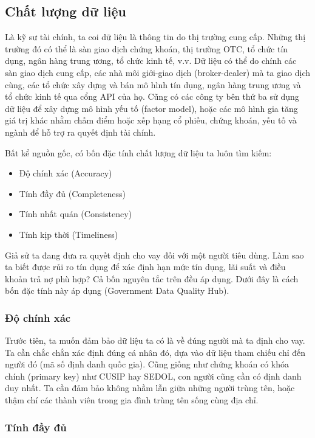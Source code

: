 \subsection{Chất lượng dữ liệu}

Là kỹ sư tài chính, ta coi dữ liệu là thông tin do thị trường cung cấp. Những thị trường đó có thể là sàn giao dịch chứng khoán, thị trường OTC, tổ chức tín dụng, ngân hàng trung ương, tổ chức kinh tế, v.v. Dữ liệu có thể do chính các sàn giao dịch cung cấp, các nhà môi giới-giao dịch (broker-dealer) mà ta giao dịch cùng, các tổ chức xây dựng và bán mô hình tín dụng, ngân hàng trung ương và tổ chức kinh tế qua cổng API của họ. Cũng có các công ty bên thứ ba sử dụng dữ liệu để xây dựng mô hình yếu tố (factor model), hoặc các mô hình gia tăng giá trị khác nhằm chấm điểm hoặc xếp hạng cổ phiếu, chứng khoán, yếu tố và ngành để hỗ trợ ra quyết định tài chính.

Bất kể nguồn gốc, có bốn đặc tính chất lượng dữ liệu ta luôn tìm kiếm:
\begin{itemize}
  \item Độ chính xác (Accuracy)
  \item Tính đầy đủ (Completeness)
  \item Tính nhất quán (Consistency)
  \item Tính kịp thời (Timeliness)
\end{itemize}

Giả sử ta đang đưa ra quyết định cho vay đối với một người tiêu dùng. Làm sao ta biết được rủi ro tín dụng để xác định hạn mức tín dụng, lãi suất và điều khoản trả nợ phù hợp? Cả bốn nguyên tắc trên đều áp dụng. Dưới đây là cách bốn đặc tính này áp dụng (Government Data Quality Hub).

\subsubsection{Độ chính xác}

Trước tiên, ta muốn đảm bảo dữ liệu ta có là về đúng người mà ta định cho vay. Ta cần chắc chắn xác định đúng cá nhân đó, dựa vào dữ liệu tham chiếu chỉ đến người đó (mã số định danh quốc gia). Cũng giống như chứng khoán có khóa chính (primary key) như CUSIP hay SEDOL, con người cũng cần có định danh duy nhất. Ta cần đảm bảo không nhầm lẫn giữa những người trùng tên, hoặc thậm chí các thành viên trong gia đình trùng tên sống cùng địa chỉ.

\subsubsection{Tính đầy đủ}

